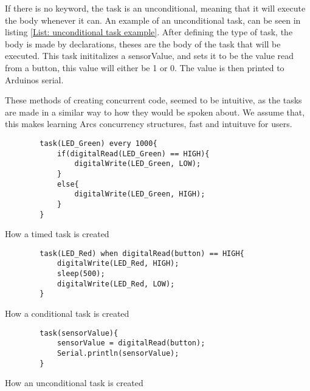 If there is no keyword, the task is an unconditional, meaning that it will execute the body whenever it can. An example of an unconditional task, can be seen in listing \ref*{List: unconditional task example}. After defining the type of task, the body is made by declarations, theses are the body of the task that will be executed. This task inititalizes a sensorValue, and sets it to be the value read from a button, this value will either be 1 or 0. The value is then printed to Arduinos serial.

These methods of creating concurrent code, seemed to be intuitive, as the tasks are made in a similar way to how they would be spoken about. We assume that, this makes learning Arcs concurrency structures, fast and intuituve for users.

\begin{listing}
    \begin{verbatim}
        task(LED_Green) every 1000{
            if(digitalRead(LED_Green) == HIGH){
                digitalWrite(LED_Green, LOW);
            }
            else{
                digitalWrite(LED_Green, HIGH);
            }
        }
    \end{verbatim}
    \caption{How a timed task is created}
    \label{List: Timed task example}
\end{listing}

\begin{listing}
    \begin{verbatim}
        task(LED_Red) when digitalRead(button) == HIGH{
            digitalWrite(LED_Red, HIGH);
            sleep(500);
            digitalWrite(LED_Red, LOW); 
        }
    \end{verbatim}
    \caption{How a conditional task is created}
    \label{List: conditional task example}
\end{listing}

\begin{listing}
    \begin{verbatim}
        task(sensorValue){
            sensorValue = digitalRead(button);
            Serial.println(sensorValue);
        }
    \end{verbatim}
    \caption{How an unconditional task is created}
    \label{List: unconditional task example}
\end{listing}








